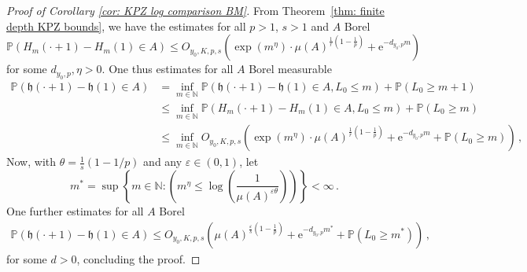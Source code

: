 \documentclass[10pt,a4paper]{amsart}
\newcommand{\PP}{\ensuremath{\mathbb{P}}}
\begin{document}
\begin{proof}[Proof of Corollary \ref{cor: KPZ log comparison BM}]
From Theorem~\ref{thm: finite depth KPZ bounds}, we have the estimates for all $p>1$, $s>1$ and $A$ Borel
\begin{equation*}
    \PP \left( H_m(\cdot + 1)-H_m(1)\in A \right)\le O_{y_0, K, p,s}\left(\exp(m^\eta)\cdot \mu(A)^{\frac{1}{r}(1-\frac{1}{p})}+ \mathrm{e}^{-d_{y_0, p} m}\right)
\end{equation*}
for some $d_{y_0,p}, \eta > 0$.
One thus estimates for all $A$ Borel measurable 
\begin{equation*}
\begin{array}{ll}
     \PP(\mathfrak{h}(\cdot + 1)-\mathfrak{h}(1)\in A) &= \displaystyle\inf_{m\in \mathbb{N}}\PP(\mathfrak{h}(\cdot + 1)-\mathfrak{h}(1)\in A, L_0\le m) + \PP(L_0\geq m+1) \\
     & \le \displaystyle\inf_{m\in \mathbb{N}}\PP(H_m(\cdot+1)-H_m(1)\in A, L_0\le m) + \PP(L_0\geq m)\\
     & \le  \displaystyle\inf_{m\in \mathbb{N}} O_{y_0, K, p,s}\left(\exp(m^\eta)\cdot \mu(A)^{\frac{1}{r}(1-\frac{1}{p})}+ \mathrm{e}^{-d_{y_0, p} m}+\PP(L_0 \ge m)\right)\,,
\end{array}
\end{equation*}
Now, with $\theta = \frac{1}{s}(1-1/p)$ and any $\varepsilon \in (0,1)$, let 
\begin{equation*}
m^* =  \displaystyle \sup \left\{m\in \mathbb{N} :  \left(m^\eta \le \log \left(\frac{1}{ \mu(A)^{\varepsilon\theta}}\right)\right)\right\}<\infty\,.
\end{equation*}
One further estimates for all $A$ Borel
\begin{equation*}
\begin{array}{cc}
     \PP(\mathfrak{h}(\cdot + 1)-\mathfrak{h}(1)\in A) \le O_{y_0, K, p,s}\left(\mu(A)^{\frac{\varepsilon}{s}(1-\frac{1}{p})} + \mathrm{e}^{-d_{y_0, p}m^*} +  \PP(L_0\geq m^{*})\right)\,,
\end{array}
\end{equation*}
for some $d > 0$, concluding the proof. 
\end{proof}
\end{document}
